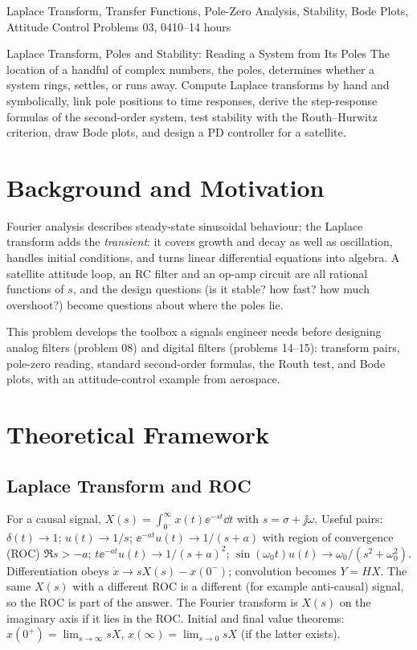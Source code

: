 \documentclass[11pt,a4paper]{article}
\begin{document}
%
{Laplace Transform, Transfer Functions, Pole-Zero Analysis, Stability, Bode Plots, Attitude Control}%
{Problems 03, 04}{10--14 hours}

\begin{summarybox}{Laplace Transform, Poles and Stability: Reading a System from Its Poles}
The location of a handful of complex numbers, the poles, determines whether a system rings, settles, or runs away. Compute Laplace transforms by hand and symbolically, link pole positions to time responses, derive the step-response formulas of the second-order system, test stability with the Routh--Hurwitz criterion, draw Bode plots, and design a PD controller for a satellite.
\end{summarybox}


\section*{Background and Motivation}
Fourier analysis describes steady-state sinusoidal behaviour; the Laplace transform adds the \emph{transient}: it covers growth and decay as well as oscillation, handles initial conditions, and turns linear differential equations into algebra. A satellite attitude loop, an RC filter and an op-amp circuit are all rational functions of $s$, and the design questions (is it stable? how fast? how much overshoot?) become questions about where the poles lie.

This problem develops the toolbox a signals engineer needs before designing analog filters (problem 08) and digital filters (problems 14--15): transform pairs, pole-zero reading, standard second-order formulas, the Routh test, and Bode plots, with an attitude-control example from aerospace.

\section*{Theoretical Framework}
\subsection{Laplace Transform and ROC}
For a causal signal, $X(s)=\int_{0^-}^{\infty}x(t)\ee^{-st}\dd t$ with $s=\sigma+\jj\omega$. Useful pairs: $\delta(t)\to1$; $u(t)\to1/s$; $\ee^{-at}u(t)\to1/(s+a)$ with region of convergence (ROC) $\Re s>-a$; $t\ee^{-at}u(t)\to1/(s+a)^2$; $\sin(\omega_0t)u(t)\to\omega_0/(s^2+\omega_0^2)$. Differentiation obeys $\dot x\to sX(s)-x(0^-)$; convolution becomes $Y=HX$. The same $X(s)$ with a different ROC is a different (for example anti-causal) signal, so the ROC is part of the answer. The Fourier transform is $X(s)$ on the imaginary axis if it lies in the ROC. Initial and final value theorems: $x(0^+)=\lim_{s\to\infty}sX$, $x(\infty)=\lim_{s\to0}sX$ (if the latter exists).
\end{document}
